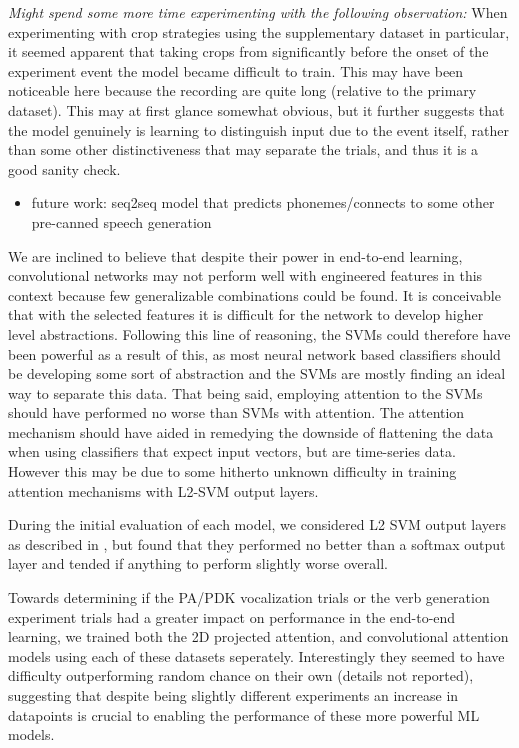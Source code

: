 \documentclass[utf8]{frontiersSCNS} %
\begin{document}
{\em Might spend some more time experimenting with the following observation:} When experimenting with crop strategies using the supplementary dataset in particular, it seemed apparent that taking crops from significantly before the onset of the experiment event the model became difficult to train. This may have been noticeable here because the recording are quite long (relative to the primary dataset). This may at first glance somewhat obvious, but it further suggests that the model genuinely is learning to distinguish input due to the event itself, rather than some other distinctiveness that may separate the trials, and thus it is a good sanity check.

\begin{itemize}
\item future work: seq2seq model that predicts phonemes/connects to some other pre-canned speech generation
\end{itemize}



We are inclined to believe that despite their power in end-to-end learning, convolutional networks may not perform well with engineered features in this context because few generalizable combinations could be found. It is conceivable that with the selected features it is difficult for the network to develop higher level abstractions. Following this line of reasoning, the SVMs could therefore have been powerful as a result of this, as most neural network based classifiers should be developing some sort of abstraction and the SVMs are mostly finding an ideal way to separate this data. That being said, employing attention to the SVMs should have performed no worse than SVMs with attention. The attention mechanism should have aided in remedying the downside of flattening the data when using classifiers that expect input vectors, but are time-series data. However this may be due to some hitherto unknown difficulty in training attention mechanisms with L2-SVM output layers.

During the initial evaluation of each model, we considered L2 SVM output layers as described in \cite{l2svmuoftpaper}, but found that they performed no better than a softmax output layer and tended if anything to perform slightly worse overall.

Towards determining if the PA/PDK vocalization trials or the verb generation experiment trials had a greater impact on performance in the end-to-end learning, we trained both the 2D projected attention, and convolutional attention models using each of these datasets seperately. Interestingly they seemed to have difficulty outperforming random chance on their own (details not reported), suggesting that despite being slightly different experiments an increase in datapoints is crucial to enabling the performance of these more powerful ML models.
\end{document}
